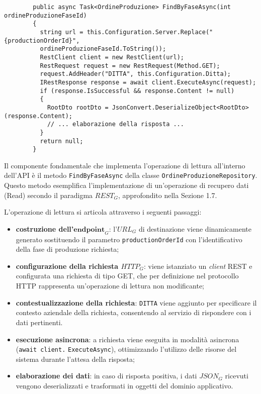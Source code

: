         \begin{verbatim}
        public async Task<OrdineProduzione> FindByFaseAsync(int ordineProduzioneFaseId)
        {
          string url = this.Configuration.Server.Replace("{productionOrderId}", 
          ordineProduzioneFaseId.ToString());
          RestClient client = new RestClient(url);
          RestRequest request = new RestRequest(Method.GET);
          request.AddHeader("DITTA", this.Configuration.Ditta);
          IRestResponse response = await client.ExecuteAsync(request);
          if (response.IsSuccessful && response.Content != null)
          {
            RootDto rootDto = JsonConvert.DeserializeObject<RootDto>(response.Content);
            // ... elaborazione della risposta ...
          }
          return null;
        }
        \end{verbatim}

        \vspace{0.2 em}
        \noindent Il componente fondamentale che implementa l'operazione di lettura all'interno dell'API è il metodo \texttt{FindByFaseAsync} della classe \texttt{OrdineProduzioneRepository}. Questo metodo esemplifica l'implementazione di un'operazione di recupero dati (Read) secondo il paradigma $REST_G$, approfondito nella Sezione 1.7.

        \vspace{0.2 em}
        \noindent L'operazione di lettura si articola attraverso i seguenti passaggi:
        \begin{itemize}
            \item \textbf{costruzione dell'\textit{$\textbf{endpoint}_G$}}: l'$URL_G$ di destinazione viene dinamicamente generato sostituendo il parametro \texttt{productionOrderId} con l'identificativo della fase di produzione richiesta;
            \item \textbf{configurazione della richiesta $HTTP_G$}: viene istanziato un \textit{client} REST e configurata una richiesta di tipo GET, che per definizione nel protocollo HTTP rappresenta un'operazione di lettura non modificante;
            \item \textbf{contestualizzazione della richiesta}: \texttt{DITTA} viene aggiunto per specificare il contesto aziendale della richiesta, consentendo al servizio di rispondere con i dati pertinenti.
            \item \textbf{esecuzione asincrona}: a richiesta viene eseguita in modalità asincrona (\texttt{await client.} 
            \texttt{ExecuteAsync}), ottimizzando l'utilizzo delle risorse del sistema durante l'attesa della risposta;
            \item \textbf{elaborazione dei dati}: in caso di risposta positiva, i dati $JSON_G$ ricevuti vengono deserializzati e trasformati in oggetti del dominio applicativo.
        \end{itemize}

